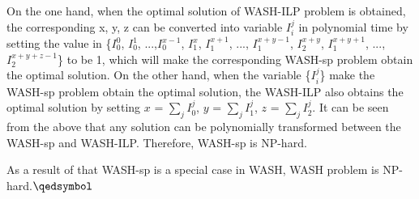 \documentclass[conference]{IEEEtran}
\begin{document}
On the one hand, when the optimal solution of WASH-ILP problem is obtained, the corresponding {x, y, z} can be converted into variable {$I_i^j$} in polynomial time by setting the value in \{$I_0^0$, $I_0^1$, ...,$I_0^{x-1}$, $I_1^{x}$, $I_1^{x+1}$, ..., $I_1^{x+y-1}$, $I_2^{x+y}$, $I_1^{x+y+1}$, ..., $I_2^{x+y+z-1}$\} to be 1, which will make the corresponding WASH-sp problem obtain the optimal solution. On the other hand, when the variable \{$I_i^j$\} make the WASH-sp problem obtain the optimal solution, the WASH-ILP also obtains the optimal solution by setting $x$ = $\sum_{j}I_0^j$, $y$ = $\sum_{j}I_1^j$, $z$ = $\sum_{j}I_2^j$. It can be seen from the above that any solution can be polynomially transformed between the WASH-sp and WASH-ILP. Therefore, WASH-sp is NP-hard. 

As a result of that WASH-sp is a special case in WASH, WASH problem is NP-hard.\hfill $\qedsymbol$
\end{document}

